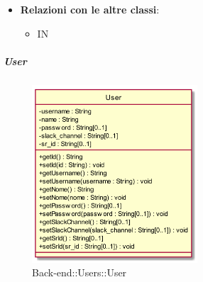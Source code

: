 \begin{itemize}
\begin{itemize}
	\end{itemize}
	\item \textbf{Relazioni con le altre classi}:
	\begin{itemize}
		\item IN \hyperlink{<<interface>>VocalLoginModule_label}{}
	\end{itemize}
\end{itemize}
\FloatBarrier

\hypertarget{User_label}{\subparagraph{User}}
\begin{figure}[h]
	\centering
	\includegraphics[width=0.55\textwidth,height=\textheight,keepaspectratio]{images/ClassUser.png}
	\caption{Back-end::Users::User}
\end{figure}
